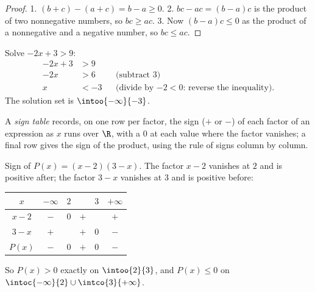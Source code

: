 \begin{proof}
1. $(b + c) - (a + c) = b - a \geq 0$.
2. $bc - ac = (b-a)c$ is the product of two nonnegative numbers, so
$bc \geq ac$.
3. Now $(b-a)c \leq 0$ as the product of a nonnegative and a negative
number, so $bc \leq ac$.
\end{proof}

\begin{example}\label{ex:g10:algebra:firstineq}
Solve $-2x + 3 > 9$:
\begin{align*}
-2x + 3 &> 9 \\
-2x &> 6 && \text{(subtract 3)} \\
x &< -3 && \text{(divide by $-2 < 0$: reverse the inequality).}
\end{align*}
The solution set is $\intoo{-\infty}{-3}$.
\end{example}

\begin{definition}\label{def:g10:algebra:signtable}
A \emph{sign table} records, on one row per factor, the
sign ($+$ or $-$) of each factor of an expression as $x$ runs over $\R$,
with a $0$ at each value where the factor vanishes; a final row gives the
sign of the product, using the rule of signs column by column.
\end{definition}

\begin{example}\label{ex:g10:algebra:signtable}
Sign of $P(x) = (x - 2)(3 - x)$. The factor $x - 2$ vanishes at $2$ and is
positive after; the factor $3 - x$ vanishes at $3$ and is positive before:
\begin{center}
\renewcommand{\arraystretch}{1.3}
\begin{tabular}{c|ccccc}
$x$ & $-\infty$ \quad & $2$ & & $3$ & \quad $+\infty$ \\
\hline
$x - 2$ & $-$ & $0$ & $+$ & & $+$ \\
$3 - x$ & $+$ & & $+$ & $0$ & $-$ \\
\hline
$P(x)$ & $-$ & $0$ & $+$ & $0$ & $-$ \\
\end{tabular}
\end{center}
So $P(x) > 0$ exactly on $\intoo{2}{3}$, and $P(x) \leq 0$ on
$\intoc{-\infty}{2} \cup \intco{3}{+\infty}$.
\end{example}

